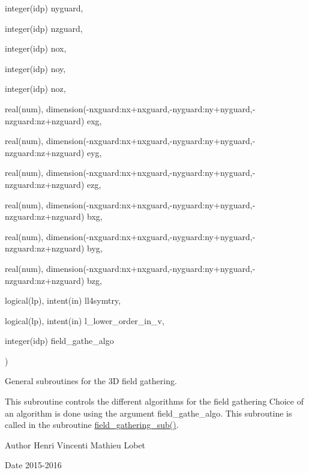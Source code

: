 {\begin{DoxyParamCaption}
\item[{integer(idp)}]{nyguard, }
\item[{integer(idp)}]{nzguard, }
\item[{integer(idp)}]{nox, }
\item[{integer(idp)}]{noy, }
\item[{integer(idp)}]{noz, }
\item[{real(num), dimension(-\/nxguard\+:nx+nxguard,-\/nyguard\+:ny+nyguard,-\/nzguard\+:nz+nzguard)}]{exg, }
\item[{real(num), dimension(-\/nxguard\+:nx+nxguard,-\/nyguard\+:ny+nyguard,-\/nzguard\+:nz+nzguard)}]{eyg, }
\item[{real(num), dimension(-\/nxguard\+:nx+nxguard,-\/nyguard\+:ny+nyguard,-\/nzguard\+:nz+nzguard)}]{ezg, }
\item[{real(num), dimension(-\/nxguard\+:nx+nxguard,-\/nyguard\+:ny+nyguard,-\/nzguard\+:nz+nzguard)}]{bxg, }
\item[{real(num), dimension(-\/nxguard\+:nx+nxguard,-\/nyguard\+:ny+nyguard,-\/nzguard\+:nz+nzguard)}]{byg, }
\item[{real(num), dimension(-\/nxguard\+:nx+nxguard,-\/nyguard\+:ny+nyguard,-\/nzguard\+:nz+nzguard)}]{bzg, }
\item[{logical(lp), intent(in)}]{ll4symtry, }
\item[{logical(lp), intent(in)}]{l\+\_\+lower\+\_\+order\+\_\+in\+\_\+v, }
\item[{integer(idp)}]{field\+\_\+gathe\+\_\+algo}
\end{DoxyParamCaption}
)}\hypertarget{field__gathering_8_f90_a02f8f275e2b38a13c4de92719714b016}{}\label{field__gathering_8_f90_a02f8f275e2b38a13c4de92719714b016}


General subroutines for the 3D field gathering. 

This subroutine controls the different algorithms for the field gathering Choice of an algorithm is done using the argument field\+\_\+gathe\+\_\+algo. This subroutine is called in the subroutine \hyperlink{field__gathering_8_f90_a331d1bcb6c50afc68081f4c9842d2aea}{field\+\_\+gathering\+\_\+sub()}. \begin{DoxyAuthor}{Author}
Henri Vincenti Mathieu Lobet 
\end{DoxyAuthor}
\begin{DoxyDate}{Date}
2015-\/2016 
\end{DoxyDate}

